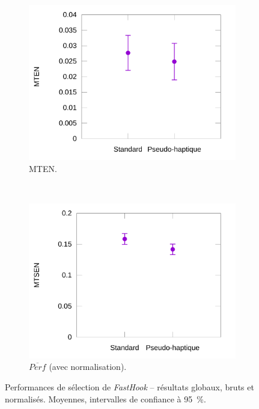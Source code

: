 \begin{figure}[!htb]
\begin{subfigure}[t]{0.49\textwidth}
			\includegraphics[width=\textwidth]{figures/ch5/phNormErrors}
			\caption{MTEN.}
			\label{fig:phNormErrors}
		\end{subfigure}
				~
		\begin{subfigure}[t]{0.49\textwidth}
			\centering
			\includegraphics[width=\textwidth]{figures/ch5/phNormProducts}
			\caption{$\overline{Perf}$ (avec normalisation).}
			\label{fig:phNormProducts}
		\end{subfigure}
		\caption[\emph{FastHook} -- résultats]{Performances de sélection de \emph{FastHook} -- résultats globaux, bruts et normalisés. Moyennes, intervalles de confiance à 95~\%{}.}
		\label{fig:fastHookAllRes}
	\end{figure}
	
